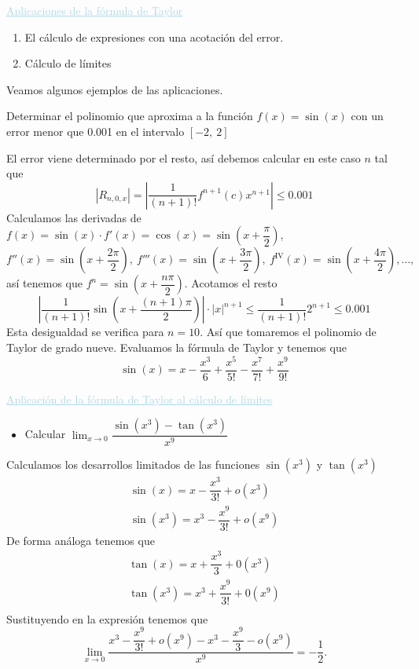 \textcolor{lightblue}{\underline{Aplicaciones de la fórmula de Taylor}}
\begin{enumerate}[label=\arabic*)]
	\item El cálculo de expresiones con una acotación del error.
	\item Cálculo de límites
\end{enumerate}
Veamos algunos ejemplos de las aplicaciones.

{\color{lightblue}Determinar el polinomio que aproxima a la función $f(x)=\sin(x)$ con un error menor que 0.001 en el intervalo $[-2,~2]$ }

El error viene determinado por el resto, así debemos calcular en este caso $n$ tal que \[ \left|R_{n,0,x}\right| =\left|\dfrac{1}{(n+1)!}f^{n+1}(c)x^{n+1}\right|\le0.001\]
Calculamos las derivadas de $f(x)=\sin(x)\cdot f'(x)=\cos(x)=\sin\left(x+\dfrac{\pi}{2}\right)$, $f''(x)=\sin\left(x+\dfrac{2\pi}{2}\right),~f'''(x)=\sin\left(x+\dfrac{3\pi}{2}\right),~f^{\mathrm{IV}}(x)=\sin\left(x+\dfrac{4\pi}{2}\right),\hdots,$ así tenemos que $f^n=\sin\left(x+\dfrac{n\pi}{2}\right)$. Acotamos el resto \[ \left|\dfrac{1}{(n+1)!}\sin\left(x+\dfrac{(n+1)\pi}{2}\right)\right| \cdot|x|^{n+1}\le\dfrac{1}{(n+1)!}2^{n+1}\le0.001\]
Esta desigualdad se verifica para $n=10$. Así que tomaremos el polinomio de Taylor de grado nueve. Evaluamos la fórmula de Taylor y tenemos que \[ \sin(x)=x-\dfrac{x^3}{6}+\dfrac{x^5}{5!}-\dfrac{x^7}{7!}+\dfrac{x^9}{9!} \]

\textcolor{lightblue}{\underline{Aplicación de la fórmula de Taylor al cálculo de límites}}

\begin{itemize}[label=\color{red}\textbullet, leftmargin=*]
	\item \color{lightblue}Calcular $\lim_{x\to0}\dfrac{\sin(x^3)-\tan(x^3)}{x^9}$
\end{itemize}
Calculamos los desarrollos limitados de las funciones $\sin(x^3)$ y $\tan(x^3)$ \[ \begin{array}{c}
	\sin(x)=x-\dfrac{x^3}{3!}+o(x^3)\\
	\sin(x^3)=x^3-\dfrac{x^9}{3!}+o(x^9)
\end{array} \]
De forma análoga tenemos que \[ \begin{array}{c}
	\tan(x)=x+\dfrac{x^3}{3}+0(x^3)\\
	\tan(x^3)=x^3+\dfrac{x^9}{3!}+0(x^9)\\
\end{array} \]
Sustituyendo en la expresión tenemos que \[ \lim_{x\to0}\dfrac{x^3-\dfrac{x^9}{3!}+o(x^9)-x^3-\dfrac{x^9}{3}-o(x^9)}{x^9}=-\dfrac{1}{2}. \]

